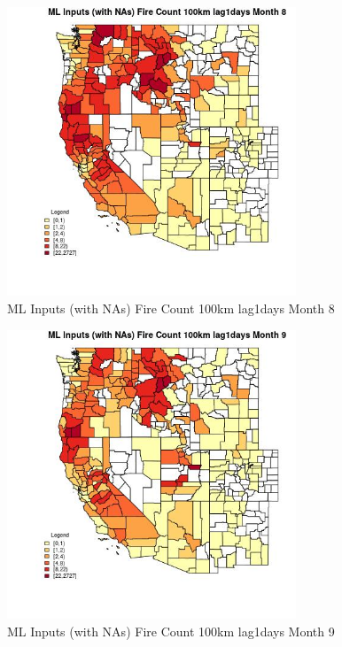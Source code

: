 \begin{figure} 
\centering  
\includegraphics[width=0.77\textwidth]{Code_Outputs/Report_ML_input_PM25_Step4_part_f_de_duplicated_aves_prioritize_24hr_obswNAs_CountyFire_Count_100km_lag1daysmedianMonth8.jpg} 
\caption{\label{fig:Report_ML_input_PM25_Step4_part_f_de_duplicated_aves_prioritize_24hr_obswNAsCountyFire_Count_100km_lag1daysmedianMonth8}ML Inputs (with NAs) Fire Count 100km lag1days Month 8} 
\end{figure} 
 

\clearpage 

\begin{figure} 
\centering  
\includegraphics[width=0.77\textwidth]{Code_Outputs/Report_ML_input_PM25_Step4_part_f_de_duplicated_aves_prioritize_24hr_obswNAs_CountyFire_Count_100km_lag1daysmedianMonth9.jpg} 
\caption{\label{fig:Report_ML_input_PM25_Step4_part_f_de_duplicated_aves_prioritize_24hr_obswNAsCountyFire_Count_100km_lag1daysmedianMonth9}ML Inputs (with NAs) Fire Count 100km lag1days Month 9} 
\end{figure} 
 

